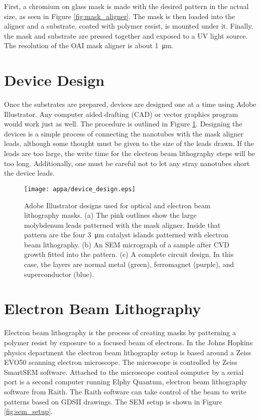 First, a chromium on glass mask is made with the desired pattern in the actual size, as seen in Figure \ref{fig:mask_aligner}. The mask is then loaded into the aligner and a substrate, coated with polymer resist, is mounted under it. Finally, the mask and substrate are pressed together and exposed to a UV light source. The resolution of the OAI mask aligner is about \SI{1}{\micro\meter}.

\section{Device Design}
\label{sec:device_design}

Once the substrates are prepared, devices are designed one at a time using Adobe Illustrator. Any computer aided drafting (CAD) or vector graphics program would work just as well. The procedure is outlined in Figure \ref{fig:device_design}. Designing the devices is a simple process of connecting the nanotubes with the mask aligner leads, although some thought must be given to the size of the leads drawn. If the leads are too large, the write time for the electron beam lithography steps will be too long. Additionally, one must be careful not to let any stray nanotubes short the device leads.

\begin{figure}
	\centering
	\texttt{[image: appa/device\_design.eps]}
	\caption{Adobe Illustrator designs used for optical and electron beam lithography masks. (a) The pink outlines show the large molybdenum leads patterned with the mask aligner. Inside that pattern are the four \SI{3}{\micro\meter} catalyst islands patterned with electron beam lithography. (b) An SEM micrograph of a sample after CVD growth fitted into the pattern. (c) A complete circuit design. In this case, the layers are normal metal (green), ferromagnet (purple), and superconductor (blue).} 
	\label{fig:device_design}
\end{figure}

\section{Electron Beam Lithography}
\label{sec:ebeam_lith}

Electron beam lithography is the process of creating masks by patterning a polymer resist by exposure to a focused beam of electrons. In the Johns Hopkins physics department the electron beam lithography setup is based around a Zeiss EVO50 scanning electron microscope. The microscope is controlled by Zeiss SmartSEM software. Attached to the microscope control computer by a serial port is a second computer running Elphy Quantum, electron beam lithography software from Raith. The Raith software can take control of the beam to write patterns based on GDSII drawings. The SEM setup is shown in Figure \ref{fig:sem_setup}.

